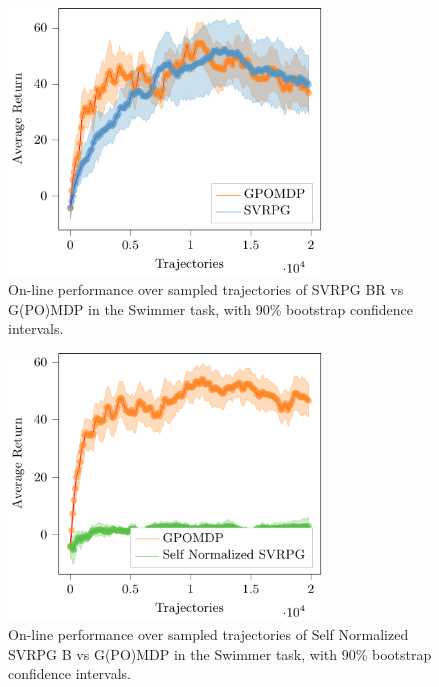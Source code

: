 \begin{figure}[h]
	\begin{minipage}[h]{1\textwidth}
		\centering
		\includegraphics[width=0.75\textwidth]{Images/Experiments/swimmer_GPOMDP_vs_SVRPG_B_reuse.pdf}
		\vspace{-0.1in}
		\caption{On-line performance over sampled trajectories of \acs{SVRPG} BR vs G(PO)MDP in the Swimmer task, with 90\% bootstrap confidence intervals.}
		\label{fig:swimmersix}
	\end{minipage}
	\vspace{-0.15in}
\end{figure}


\begin{figure}[h]
	\begin{minipage}[h]{1\textwidth}
		\centering
		\includegraphics[width=0.75\textwidth]{Images/Experiments/swimmer_Self_SVRPG_vs_GPOMDP_B.pdf}
		\vspace{-0.1in}
		\caption{On-line performance over sampled trajectories of Self Normalized \acs{SVRPG} B vs G(PO)MDP in the Swimmer task, with 90\% bootstrap confidence intervals.}
		\label{fig:swimmerthree}
	\end{minipage}
	\vspace{-0.15in}
\end{figure}

